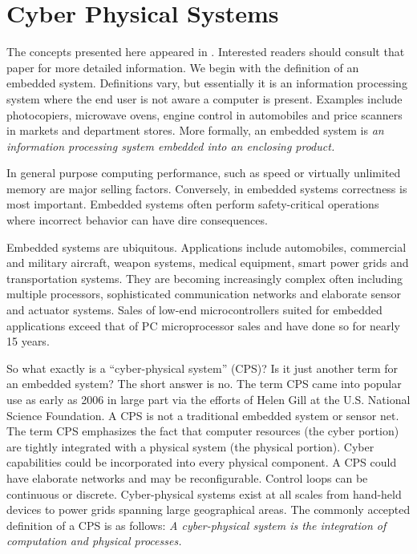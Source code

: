 \section{Cyber Physical Systems}
\label{sec:cps}
The concepts presented here appeared in \cite{Greenwood2015}. Interested readers should consult that paper for more detailed information. We begin with the definition of an embedded system. Definitions vary, but essentially it is an information processing system where the end user is not aware a computer is
present. Examples include photocopiers, microwave ovens, engine control in automobiles and price scanners in markets and department stores. More formally, an embedded system is \textit{an information processing system embedded into an enclosing product.}

In general purpose computing performance, such as speed or virtually unlimited memory are major selling factors. Conversely, in embedded systems correctness is most important. Embedded systems often perform safety-critical operations where incorrect behavior can have dire consequences.

Embedded systems are ubiquitous. Applications include automobiles, commercial and military aircraft, weapon systems, medical equipment, smart power grids and transportation systems. They are becoming increasingly complex often including multiple processors, sophisticated communication networks and elaborate sensor and actuator systems. Sales of low-end microcontrollers suited for embedded applications exceed that of PC microprocessor sales and have done so for nearly 15 years.

So what exactly is a “cyber-physical system” (CPS)? Is it just another term for an embedded system? The short answer is no. The term CPS came into popular use as early as 2006 in large part via the efforts of Helen Gill at the U.S. National Science Foundation. A CPS is not a traditional embedded system or sensor net. The term CPS emphasizes the fact that computer resources (the cyber portion) are tightly integrated with a physical system (the physical portion). Cyber capabilities could be incorporated into every physical component. A CPS could have elaborate networks and may be reconfigurable. Control loops can be continuous or discrete. Cyber-physical systems exist at all scales from hand-held devices to power grids spanning large geographical areas. The commonly accepted definition of a CPS is as follows: \textit{A cyber-physical system is the integration of computation and physical processes.}

